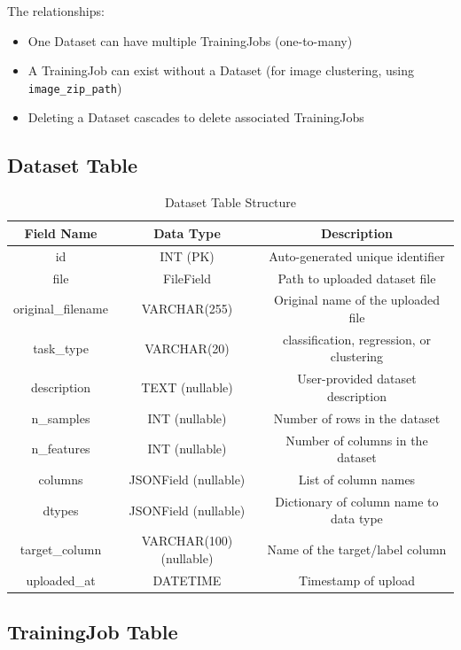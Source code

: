 \documentclass[12pt,a4paper]{report}
\begin{document}
The relationships:
\begin{itemize}
    \item One Dataset can have multiple TrainingJobs (one-to-many)
    \item A TrainingJob can exist without a Dataset (for image clustering, using \texttt{image\_zip\_path})
    \item Deleting a Dataset cascades to delete associated TrainingJobs
\end{itemize}

\subsection*{Dataset Table}

\begin{table}[H]
\centering
\caption{Dataset Table Structure}
\begin{tabular}{|c|c|c|}
\hline
\textbf{Field Name} & \textbf{Data Type} & \textbf{Description} \\
\hline
id & INT (PK) & Auto-generated unique identifier \\
file & FileField & Path to uploaded dataset file \\
original\_filename & VARCHAR(255) & Original name of the uploaded file \\
task\_type & VARCHAR(20) & classification, regression, or clustering \\
description & TEXT (nullable) & User-provided dataset description \\
n\_samples & INT (nullable) & Number of rows in the dataset \\
n\_features & INT (nullable) & Number of columns in the dataset \\
columns & JSONField (nullable) & List of column names \\
dtypes & JSONField (nullable) & Dictionary of column name to data type \\
target\_column & VARCHAR(100) (nullable) & Name of the target/label column \\
uploaded\_at & DATETIME & Timestamp of upload \\
\hline
\end{tabular}
\end{table}

\subsection*{TrainingJob Table}
\end{document}
